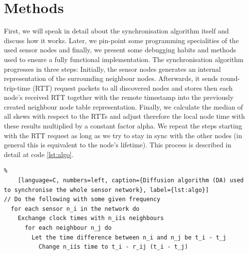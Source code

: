 \documentclass{llncs}
\begin{document}
\section{Methods}

First, we will speak in detail about the synchronisation algorithm itself and discuss how it works. Later, we pin-point some programming specialities of the used sensor nodes and finally, we present some debugging habits and methods used to ensure a fully functional implementation.
\bigbreak
\noindent The synchronisation algorithm progresses in three steps: Initially, the sensor nodes generates an internal representation of the surrounding neighbour nodes. Afterwards, it sends round-trip-time (RTT) request packets to all discovered nodes and stores then each node's received RTT together with the remote timestamp into the previously created neighbour node table representation. Finally, we calculate the median of all skews with respect to the RTTs and adjust therefore the local node time with these results multiplied by a constant factor alpha. We repeat the steps starting with the RTT request as long as we try to stay in sync with the other nodes (in general this is equivalent to the node's lifetime). This process is described in detail at code \ref{lst:algo}.

\begin{lstlisting}%
	[language=C, numbers=left, caption={Diffusion algorithm (DA) used to synchronise the whole sensor network}, label={lst:algo}]
// Do the following with some given frequency
  for each sensor n_i in the network do
    Exchange clock times with n_iís neighbours
      for each neighbour n_j do
        Let the time difference between n_i and n_j be t_i - t_j
          Change n_iís time to t_i - r_ij (t_i - t_j)
\end{lstlisting}
\end{document}
